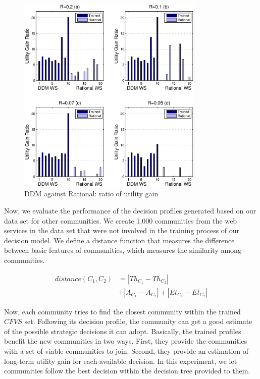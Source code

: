 \documentclass[11pt,onecolumn]{IEEEtran}
\begin{document}
{\begin{figure}%
\centering
\includegraphics[width=3.5in]{figures/utility_ratio.eps}
\caption{DDM against Rational: ratio of utility gain}
\label{utility_gain_mlisa_and_rational_ratio}
\end{figure}

Now, we evaluate the performance of the decision profiles generated based on our data set for other communities.%
We create 1,000 communities from the web services in the data set that were not involved in the training process of our decision model. We define a distance function that measures the difference between basic features of communities, which measures the similarity among communities.

\begin{equation}\label{distance_c}
\begin{split}
distance (C_1, C_2) & = |Th_{C_1} - Th_{C_2}| \\
                    & + |A_{C_1} - A_{C_2}| + |Et_{C_1} - Et_{C_2}|
\end{split}
\end{equation}

Now, each community tries to find the closest community within the trained $CFVS$ set. Following its decision profile, the community can get a good estimate of the possible strategic decisions it can adopt. Basically, the trained profiles benefit the new communities in two ways. First, they provide the communities with a set of viable communities to join. Second, they provide an estimation of long-term utility gain for each available decision. In this experiment, we let communities follow the best decision within the decision tree provided to them. 


}
\end{document}
